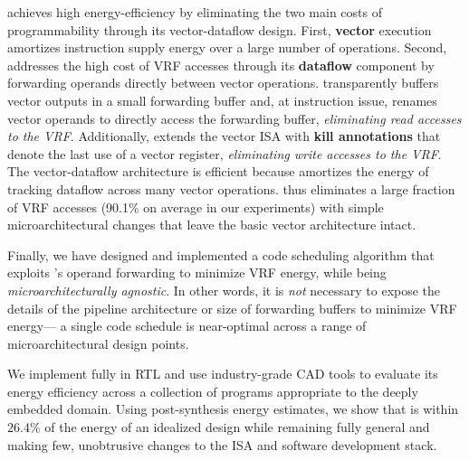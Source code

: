\manic achieves high energy-efficiency by eliminating the two main costs of
programmability through its vector-dataflow design.
%
First, \textbf{vector} execution amortizes
instruction supply energy over a large number of operations.
%
Second, \manic addresses the high cost of VRF accesses
through its \textbf{dataflow} component by forwarding operands 
directly between vector operations.
%
\manic transparently buffers vector outputs in a small {forwarding buffer}
and, at instruction issue, renames vector operands to directly access
the forwarding buffer, \emph{eliminating read accesses to the VRF}.
%
Additionally, \manic extends the vector ISA with \textbf{kill annotations} that denote
the last use of a vector register,
\emph{eliminating write accesses to the VRF}.
%
The vector-dataflow architecture is efficient because \manic amortizes the energy of tracking dataflow across many vector operations.
%
\manic thus eliminates a large fraction of VRF accesses (90.1\% on average in our experiments)
with simple microarchitectural changes that leave the basic vector architecture intact.

Finally, we have designed and implemented a code scheduling algorithm
that exploits \manic's operand forwarding to minimize VRF energy, while being \emph{microarchitecturally agnostic}.
In other words, it is \emph{not} necessary to expose the details
of the pipeline architecture or size of forwarding buffers
to minimize VRF energy---%
a single code schedule is near-optimal across a range of microarchitectural design points.

We implement \manic fully in RTL and use industry-grade CAD tools to
evaluate its energy efficiency across a collection of programs appropriate to the deeply embedded domain.
%
Using post-synthesis energy estimates, we show that \manic
is within $26.4\%$ of the energy of an idealized design while remaining fully general and making few, unobtrusive changes to the ISA and software development stack.
%
\figMANICDesignSpace

